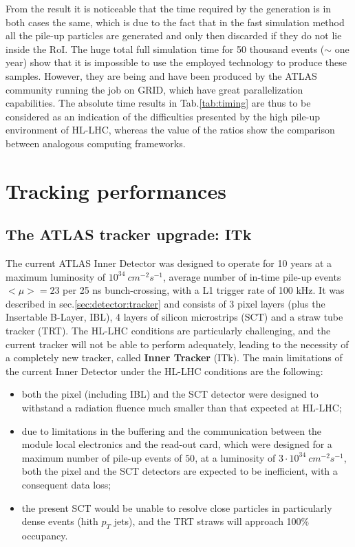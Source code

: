 \documentclass[a4paper,twoside,12pt]{article}
\begin{document}
From the result it is noticeable that the time required by the generation is in both cases
the same, which is due to the fact that in the fast simulation method all the pile-up particles
are generated and only then discarded if they do not lie inside the RoI. The huge total full
simulation time for 50 thousand events ($\sim$ one year) show that it is impossible to use
the employed technology to produce these samples. However, they are being and 
have been produced by the ATLAS community running the job on GRID\cite{ATLASGrid}, which
have great parallelization capabilities. The absolute time results in Tab.\ref{tab:timing} are thus to be
considered as an indication of the difficulties presented by the high pile-up environment of
HL-LHC, whereas the value of the ratios show the comparison between analogous computing
frameworks.

\clearpage

\section{Tracking performances}\label{sec:tracking}

\subsection{The ATLAS tracker upgrade: ITk}
The current ATLAS Inner Detector was designed to operate for 10 years at a maximum luminosity of $10^{34}\ cm^{-2} s^{-1}$, 
average number of in-time pile-up events $<\mu> = 23$ per 25 ns bunch-crossing, with a L1 trigger rate of 100 kHz\cite{loi}. It
was described in sec.\ref{sec:detector:tracker} and consists of 3 pixel layers (plus the Insertable B-Layer, IBL), 4 layers of silicon microstrips (SCT)
and a straw tube tracker (TRT). The HL-LHC conditions are particularly challenging, and the current tracker will not be able to perform adequately, leading to the necessity of a completely new tracker, called \textbf{Inner Tracker} (ITk). The main limitations of the current Inner Detector under the HL-LHC conditions are the following:

\begin{itemize}
\item both the pixel (including IBL) and the SCT detector were designed to withstand a radiation fluence much smaller
than that expected at HL-LHC;
\item due to limitations in the buffering and the communication between the module local electronics and the read-out card, which
were designed for a maximum number of pile-up events of $50$,
at a luminosity of $3 \cdot 10^{34}\ cm^{-2}s^{-1}$, both the pixel and the SCT detectors are expected to be inefficient, with
a consequent data loss;
\item the present SCT would be unable to resolve close particles in particularly dense events (hith $p_{T}$ jets), and the TRT straws
	will approach 100\% occupancy.
\end{itemize}
\end{document}
